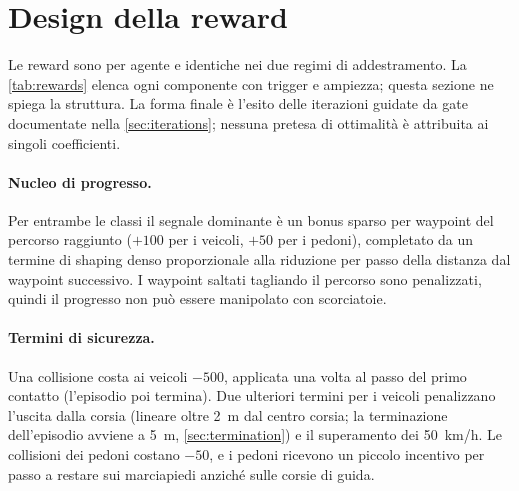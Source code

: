 \section{Design della reward}
\label{sec:rewards}

Le reward sono per agente e identiche nei due regimi di addestramento.
La \cref{tab:rewards} elenca ogni componente con trigger e ampiezza;
questa sezione ne spiega la struttura. La forma finale è l'esito delle
iterazioni guidate da gate documentate nella \cref{sec:iterations};
nessuna pretesa di ottimalità è attribuita ai singoli coefficienti.

\paragraph{Nucleo di progresso.}
Per entrambe le classi il segnale dominante è un bonus sparso per
waypoint del percorso raggiunto ($+100$ per i veicoli, $+50$ per i
pedoni), completato da un termine di shaping denso proporzionale alla
riduzione per passo della distanza dal waypoint successivo. I waypoint
saltati tagliando il percorso sono penalizzati, quindi il progresso non
può essere manipolato con scorciatoie.

\paragraph{Termini di sicurezza.}
Una collisione costa ai veicoli $-500$, applicata una volta al passo del
primo contatto (l'episodio poi termina). Due ulteriori termini per i
veicoli penalizzano l'uscita dalla corsia (lineare oltre \SI{2}{m} dal
centro corsia; la terminazione dell'episodio avviene a \SI{5}{m},
\cref{sec:termination}) e il superamento dei 50~km/h. Le collisioni dei
pedoni costano $-50$, e i pedoni ricevono un piccolo incentivo per passo
a restare sui marciapiedi anziché sulle corsie di guida.

